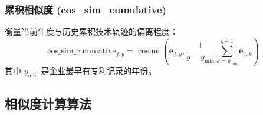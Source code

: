 \documentclass[12pt,a4paper]{article}
\theoremstyle{definition}
\newcommand{\vect}[1]{\mathbf{#1}}
\DeclareMathOperator{\cosine}{cosine}
\begin{document}
\subsubsection{累积相似度 (cos\_sim\_cumulative)}

衡量当前年度与历史累积技术轨迹的偏离程度：
\begin{equation}
    \text{cos\_sim\_cumulative}_{f,y} = \cosine\left(\bar{\vect{e}}_{f,y}, \frac{1}{y - y_{\min}}\sum_{k=y_{\min}}^{y-1} \bar{\vect{e}}_{f,k}\right)
\end{equation}
其中 $y_{\min}$ 是企业最早有专利记录的年份。

\subsection{相似度计算算法}
\end{document}
